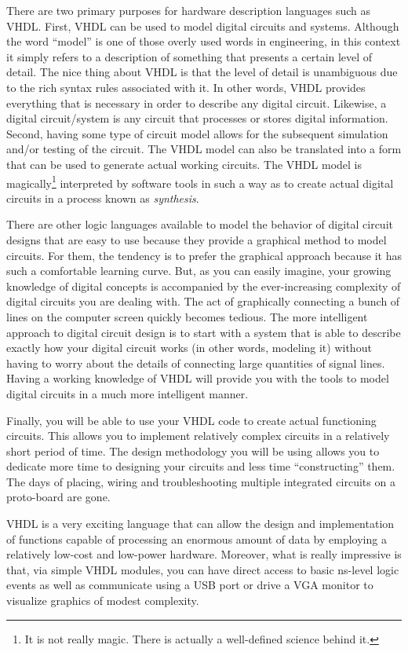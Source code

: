 There are two primary purposes for hardware description languages such as VHDL. First, VHDL can be used to model digital circuits and systems. Although the word ``model'' is one of those overly used words in engineering, in this context it simply refers to a description of something that presents a certain level of detail. The nice thing about VHDL is that the level of detail is unambiguous due to the rich syntax rules associated with it. In other words, VHDL provides everything that is necessary in order to describe any digital circuit. Likewise, a digital circuit/system is any circuit that processes or stores digital information. Second, having some type of circuit model allows for the subsequent simulation and/or testing of the circuit. The VHDL model can also be translated into a form that can be used to generate actual working circuits. The VHDL model is magically\footnote{It is not really magic. There is actually a well-defined science behind it.} interpreted by software tools in such a way as to create actual digital circuits in a process known as \textit{synthesis}.

There are other logic languages available to model the behavior of digital circuit designs that are easy to use because they provide a graphical method to model circuits. For them, the tendency is to prefer the graphical approach because it has such a comfortable learning curve. But, as you can easily imagine, your growing knowledge of digital concepts is accompanied by the ever-increasing complexity of digital circuits you are dealing with. The act of graphically connecting a bunch of lines on the computer screen quickly becomes tedious. The more intelligent approach to digital circuit design is to start with a system that is able to describe exactly how your digital circuit works (in other words, modeling it) without having to worry about the details of connecting large quantities of signal lines. Having a working knowledge of VHDL will provide you with the tools to model digital circuits in a much more intelligent manner.

Finally, you will be able to use your VHDL code to create actual functioning circuits. This allows you to implement relatively complex circuits in a relatively short period of time. The design methodology you will be using allows you to dedicate more time to designing your circuits and less time ``constructing'' them. The days of placing, wiring and troubleshooting multiple integrated circuits on a proto-board are gone.

VHDL is a very exciting language that can allow the design and implementation of functions capable of processing an enormous amount of data by employing a relatively low-cost and low-power hardware. Moreover, what is really impressive is that, via simple VHDL modules, you can have direct access to basic ns-level logic events as well as communicate using a USB port or drive a VGA monitor to visualize graphics of modest complexity.

